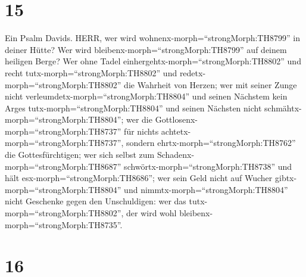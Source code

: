 \hypertarget{section-14}{%
\section{15}\label{section-14}}

 Ein Psalm Davids. HERR, wer wird
wohnenx-morph=``strongMorph:TH8799'' in deiner Hütte? Wer wird
bleibenx-morph=``strongMorph:TH8799'' auf deinem heiligen Berge?
 Wer ohne Tadel einhergehtx-morph=``strongMorph:TH8802'' und
recht tutx-morph=``strongMorph:TH8802'' und
redetx-morph=``strongMorph:TH8802'' die Wahrheit von Herzen;
 wer mit seiner Zunge nicht
verleumdetx-morph=``strongMorph:TH8804'' und seinen Nächstem kein Arges
tutx-morph=``strongMorph:TH8804'' und seinen Nächsten nicht
schmähtx-morph=``strongMorph:TH8804'';  wer die
Gottlosenx-morph=``strongMorph:TH8737'' für nichts
achtetx-morph=``strongMorph:TH8737'', sondern
ehrtx-morph=``strongMorph:TH8762'' die Gottesfürchtigen; wer sich selbst
zum Schadenx-morph=``strongMorph:TH8687''
schwörtx-morph=``strongMorph:TH8738'' und hält
esx-morph=``strongMorph:TH8686'';  wer sein Geld nicht auf
Wucher gibtx-morph=``strongMorph:TH8804'' und
nimmtx-morph=``strongMorph:TH8804'' nicht Geschenke gegen den
Unschuldigen: wer das tutx-morph=``strongMorph:TH8802'', der wird wohl
bleibenx-morph=``strongMorph:TH8735''.

\hypertarget{section-15}{%
\section{16}\label{section-15}}

